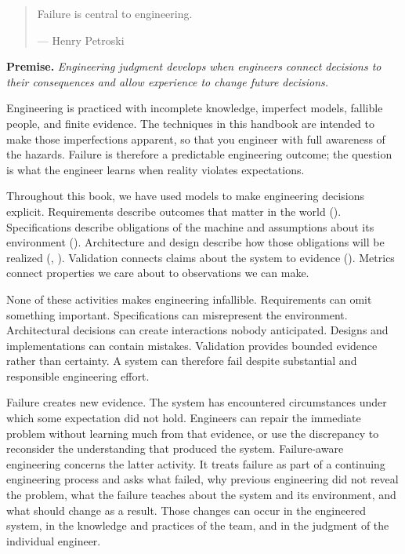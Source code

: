 \begin{quote}
Failure is central to engineering.

--- Henry Petroski \citep{petroski1992}
\end{quote}

\textbf{Premise.} \emph{Engineering judgment develops when engineers connect decisions to their consequences
and allow experience to change future decisions.}

Engineering is practiced with incomplete knowledge, imperfect models, fallible people, and finite
evidence. The techniques in this handbook are intended to make those imperfections apparent, so
that you engineer with full awareness of the hazards. Failure is therefore a predictable
engineering outcome; the question is what the engineer learns when reality violates expectations.

Throughout this book, we have used models to make engineering decisions explicit. Requirements
describe outcomes that matter in the world (\citet{ch-requirements}). Specifications describe obligations
of the machine and assumptions about its environment (\citet{ch-specification}). Architecture and design
describe how those obligations will be realized (\citet{ch-architecture}, \citet{ch-design}). Validation connects
claims about the system to evidence (\citet{ch-validation}). Metrics connect properties we care about to
observations we can make.

None of these activities makes engineering infallible. Requirements can omit something important.
Specifications can misrepresent the environment. Architectural decisions can create interactions
nobody anticipated. Designs and implementations can contain mistakes. Validation provides bounded
evidence rather than certainty. A system can therefore fail despite substantial and responsible
engineering effort.

Failure creates new evidence. The system has encountered circumstances under which some expectation
did not hold. Engineers can repair the immediate problem without learning much from that evidence,
or use the discrepancy to reconsider the understanding that produced the system. Failure-aware
engineering concerns the latter activity. It treats failure as part of a continuing engineering
process and asks what failed, why previous engineering did not reveal the problem, what the failure
teaches about the system and its environment, and what should change as a result. Those changes can
occur in the engineered system, in the knowledge and practices of the team, and in the judgment of
the individual engineer.


